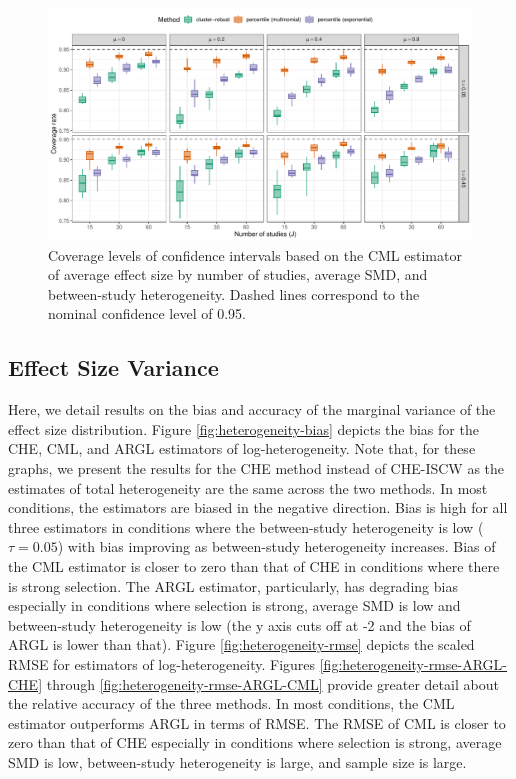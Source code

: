 \documentclass[
  man, donotrepeattitle,floatsintext]{apa7}
\begin{document}
\begin{figure}
\includegraphics{selection_models_draft_files/figure-latex/CML-coverage-1} \caption{Coverage levels of confidence intervals based on the CML estimator of average effect size by number of studies, average SMD, and between-study heterogeneity. Dashed lines correspond to the nominal confidence level of 0.95.}\label{fig:CML-coverage}
\end{figure}

\subsection{Effect Size Variance}\label{effect-size-variance}

Here, we detail results on the bias and accuracy of the marginal variance of the effect size distribution. Figure \ref{fig:heterogeneity-bias} depicts the bias for the CHE, CML, and ARGL estimators of log-heterogeneity. Note that, for these graphs, we present the results for the CHE method instead of CHE-ISCW as the estimates of total heterogeneity are the same across the two methods. In most conditions, the estimators are biased in the negative direction. Bias is high for all three estimators in conditions where the between-study heterogeneity is low (\(\tau = 0.05\)) with bias improving as between-study heterogeneity increases. Bias of the CML estimator is closer to zero than that of CHE in conditions where there is strong selection. The ARGL estimator, particularly, has degrading bias especially in conditions where selection is strong, average SMD is low and between-study heterogeneity is low (the y axis cuts off at -2 and the bias of ARGL is lower than that). Figure \ref{fig:heterogeneity-rmse} depicts the scaled RMSE for estimators of log-heterogeneity. Figures \ref{fig:heterogeneity-rmse-ARGL-CHE} through \ref{fig:heterogeneity-rmse-ARGL-CML} provide greater detail about the relative accuracy of the three methods. In most conditions, the CML estimator outperforms ARGL in terms of RMSE. The RMSE of CML is closer to zero than that of CHE especially in conditions where selection is strong, average SMD is low, between-study heterogeneity is large, and sample size is large.
\end{document}
